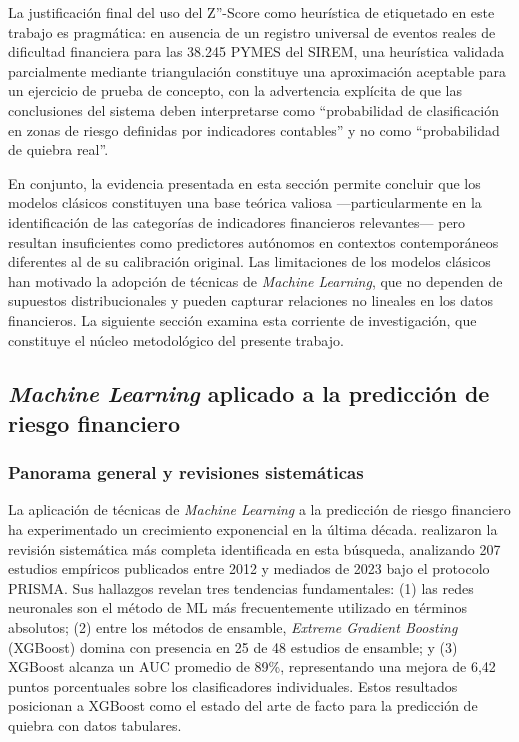\documentclass[12pt, letterpaper]{article}
\begin{document}
La justificaci\'on final del uso del Z''-Score como heur\'istica de etiquetado en este trabajo es pragm\'atica: en ausencia de un registro universal de eventos reales de dificultad financiera para las 38.245 PYMES del SIREM, una heur\'istica validada parcialmente mediante triangulaci\'on constituye una aproximaci\'on aceptable para un ejercicio de prueba de concepto, con la advertencia expl\'icita de que las conclusiones del sistema deben interpretarse como ``probabilidad de clasificaci\'on en zonas de riesgo definidas por indicadores contables'' y no como ``probabilidad de quiebra real''.

En conjunto, la evidencia presentada en esta secci\'on permite concluir que los modelos cl\'asicos constituyen una base te\'orica valiosa ---particularmente en la identificaci\'on de las categor\'ias de indicadores financieros relevantes--- pero resultan insuficientes como predictores aut\'onomos en contextos contempor\'aneos diferentes al de su calibraci\'on original. Las limitaciones de los modelos cl\'asicos han motivado la adopci\'on de t\'ecnicas de \textit{Machine Learning}, que no dependen de supuestos distribucionales y pueden capturar relaciones no lineales en los datos financieros. La siguiente secci\'on examina esta corriente de investigaci\'on, que constituye el n\'ucleo metodol\'ogico del presente trabajo.

\subsection{\textit{Machine Learning} aplicado a la predicci\'on de riesgo financiero}
\label{sec:ml}

\subsubsection{Panorama general y revisiones sistem\'aticas}

La aplicaci\'on de t\'ecnicas de \textit{Machine Learning} a la predicci\'on de riesgo financiero ha experimentado un crecimiento exponencial en la \'ultima d\'ecada. \citet{Dasilas2024} realizaron la revisi\'on sistem\'atica m\'as completa identificada en esta b\'usqueda, analizando 207 estudios emp\'iricos publicados entre 2012 y mediados de 2023 bajo el protocolo PRISMA. Sus hallazgos revelan tres tendencias fundamentales: (1) las redes neuronales son el m\'etodo de ML m\'as frecuentemente utilizado en t\'erminos absolutos; (2) entre los m\'etodos de ensamble, \textit{Extreme Gradient Boosting} (XGBoost) domina con presencia en 25 de 48 estudios de ensamble; y (3) XGBoost alcanza un AUC promedio de 89\%, representando una mejora de 6,42 puntos porcentuales sobre los clasificadores individuales. Estos resultados posicionan a XGBoost como el estado del arte de facto para la predicci\'on de quiebra con datos tabulares.
\end{document}
